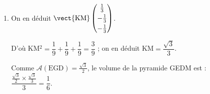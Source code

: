 \begin{enumerate}
\begin{enumerate}
Conclusion : K a pour coordonnées $\left(\dfrac{1}{3}~;~\dfrac{2}{3}~;~\dfrac{2}{3} \right)$.
		\item 
On en déduit $\vect{\text{KM}}\begin{pmatrix}\frac{1}{3}\\[3pt]- \frac{1}{3}\\[3pt]- \frac{1}{3}\end{pmatrix}$.

D'où KM$^2 = \dfrac{1}{9} + \dfrac{1}{9} + \dfrac{1}{9} = \dfrac{3}{9}$ ; on en déduit KM$ = \dfrac{\sqrt{3}}{3}$.
		




Comme $\mathcal{A}(\text{EGD}) = \frac{\sqrt{3}}{2}$, le volume de la pyramide GEDM est  : $\dfrac{\frac{\sqrt{3}}{2}\times \frac{\sqrt{3}}{3}}{3} = \dfrac{1}{6}$.
	\end{enumerate}
\end{enumerate}

\bigskip
